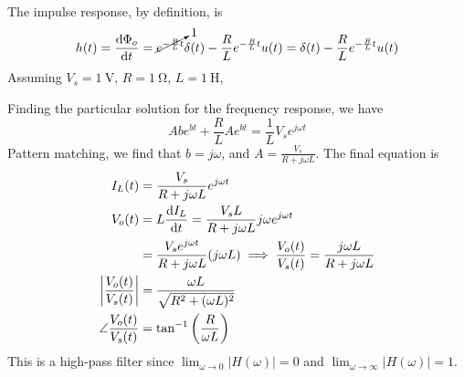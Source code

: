 \documentclass{article}
\begin{document}
\begin{subparts}
    The impulse response, by definition, is
    \begin{equation}
        h(t) = \dv{\Phi_o}{t} = \cancelto{1}{e^{-\frac{R}{L} t}} \delta(t) - \frac{R}{L} e^{-\frac{R}{L} t} u(t) = \delta(t) - \frac{R}{L} e^{-\frac{R}{L} t} u(t)
    \end{equation}
    Assuming \(V_s = \qty{1}{\volt}\), \(R = \qty{1}{\ohm}\), \(L = \qty{1}{\henry}\),
    \begin{center}
    \end{center}
    \item Finding the particular solution for the frequency response, we have
    \begin{equation}
        A be^{bt} + \frac{R}{L} A e^{bt} = \frac{1}{L} V_s e^{j \omega t}
    \end{equation}
    Pattern matching, we find that \(b = j \omega\), and \(A = \frac{V_s}{R + j \omega L}\).
    The final equation is
    \begin{align}
        I_L(t) &= \frac{V_s}{R + j \omega L} e^{j \omega t} \\
        V_o(t) &= L \dv{I_L}{t} = \frac{V_s L}{R + j \omega L} j \omega e^{j \omega t} \\
        &= \frac{V_s e^{j \omega t}}{R + j \omega L} (j \omega L) \implies \frac{V_o(t)}{V_s(t)} = \frac{j \omega L}{R + j \omega L} \\
        \left|\frac{V_o(t)}{V_s(t)}\right| &= \frac{\omega L}{\sqrt{R^2 + (\omega L)^2}} \\
        \angle \frac{V_o(t)}{V_s(t)} &= \tan^{-1}\left(\frac{R}{\omega L}\right)
    \end{align}
    This is a high-pass filter since \(\lim_{\omega \to 0} |H(\omega)| = 0\) and \(\lim_{\omega \to \infty} |H(\omega)| = 1\).
\end{subparts}
\end{document}
